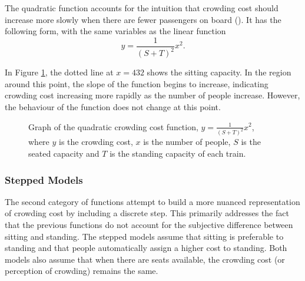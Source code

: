 \smallskip
{}


The quadratic function accounts for the intuition that crowding cost should increase more slowly when there are fewer passengers on board (). It has the following form, with the same variables as the linear function \cite{klumpenhouwerCostcrowdingModelLight2016}
\begin{equation}
    \label{eqn:quadratic}
    y=\frac{1}{(S+T)^2}x^2.
\end{equation}

In Figure \ref{fig:Crowding_quadratic}, the dotted line at $x=432$ shows the sitting capacity. In the region around this point, the slope of the function begins to increase, indicating crowding cost increasing more rapidly as the number of people increase. However, the behaviour of the function does not change at this point.

\begin{figure}[ht]
    \centering
    \caption[Graph of the quadratic crowding cost function]{Graph of the quadratic crowding cost function, $y=\frac{1}{(S+T)^2}x^2$,  where $y$ is the crowding cost, $x$ is the number of people, $S$ is the seated capacity and $T$ is the standing capacity of each train.}
    \label{fig:Crowding_quadratic}
\end{figure}

\subsubsection{Stepped Models}
\label{subsubsec:crowding_stepped}
The second category of functions attempt to build a more nuanced representation of crowding cost by including a discrete step. This primarily addresses the fact that the previous functions do not account for the subjective difference between sitting and standing. The stepped models assume that sitting is preferable to standing and that people automatically assign a higher cost to standing. Both models also assume that when there are seats available, the crowding cost (or perception of crowding) remains the same. 

